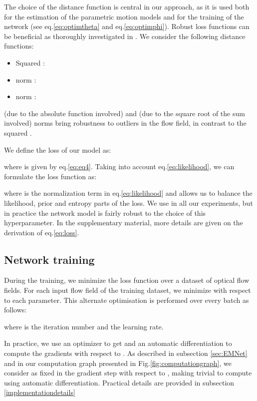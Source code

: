 \documentclass[10pt,twocolumn,letterpaper]{article}
\begin{document}
The choice of the distance function  is central in our approach, as it is used both for the estimation of the parametric motion models and for the training of the network (see eq.\eqref{eq:optimtheta} and eq.\eqref{eq:optimphi}). Robust loss functions can be beneficial as thoroughly investigated in \cite{barron2019}. We consider the following distance functions: 
\begin{itemize}
\item Squared  : 
\item   norm : 
\item   norm : 
\end{itemize}
 (due to the absolute function involved) and  (due to the square root of the sum involved) norms bring robustness to outliers in the flow field, in contrast to the squared .


We define the loss of our model as:

where  is given by eq.\eqref{eq:eq4}. Taking into account eq.\eqref{eq:likelihood}, we can formulate the loss function as: 

where {\color{black}  is the normalization term in eq.\eqref{eq:likelihood} and}  allows us to balance the likelihood, prior and entropy parts of the loss.
We use  in all our experiments, but in practice the network model is fairly robust to the choice of this hyperparameter. {\color{black}In the supplementary material, more details are given on the derivation of eq.\eqref{eq:loss}.} 

\subsection{Network training}
\label{training}

During the training, we minimize the loss function  over a dataset of optical flow fields. For each input flow field  of the training dataset, we minimize  with respect to each parameter. This alternate optimisation is performed over every batch  as follows: 


where  is the iteration number and  the learning rate. 


In practice, we use an optimizer to get  and an automatic differentiation to compute the gradients with respect to . As described in subsection \ref{sec:EMNet} and in our computation graph presented in Fig.\ref{fig:computationgraph}, we consider  as fixed in the gradient step with respect to , making  trivial to compute using automatic differentiation. Practical details are provided in subsection \ref{implementationdetails} 
\end{document}
